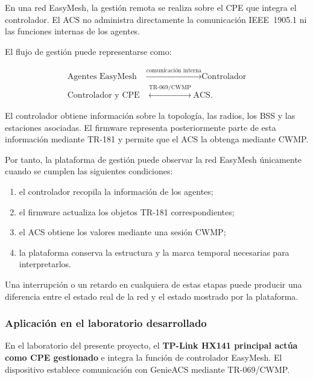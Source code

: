 En una red EasyMesh, la gestión remota se realiza sobre el CPE que integra
el controlador. El ACS no administra directamente la comunicación
IEEE~1905.1 ni las funciones internas de los agentes.

El flujo de gestión puede representarse como:

\[
\begin{aligned}
    \text{Agentes EasyMesh}
    &\xrightarrow{\text{comunicación interna}}
    \text{Controlador}\\
    \text{Controlador y CPE}
    &\overset{\text{TR-069/CWMP}}{\longleftrightarrow}
    \text{ACS}.
\end{aligned}
\]

El controlador obtiene información sobre la topología, las radios, los
BSS y las estaciones asociadas. El firmware representa posteriormente
parte de esta información mediante TR-181 y permite que el ACS la obtenga
mediante CWMP.

Por tanto, la plataforma de gestión puede observar la red EasyMesh
únicamente cuando se cumplen las siguientes condiciones:

\begin{enumerate}
    \item el controlador recopila la información de los agentes;

    \item el firmware actualiza los objetos TR-181 correspondientes;

    \item el ACS obtiene los valores mediante una sesión CWMP;

    \item la plataforma conserva la estructura y la marca temporal
    necesarias para interpretarlos.
\end{enumerate}

Una interrupción o un retardo en cualquiera de estas etapas puede
producir una diferencia entre el estado real de la red y el estado
mostrado por la plataforma.


\subsubsection*{Aplicación en el laboratorio desarrollado}

En el laboratorio del presente proyecto, el
\textbf{TP-Link HX141 principal actúa como CPE gestionado} e integra la
función de controlador EasyMesh. El dispositivo establece comunicación
con GenieACS mediante TR-069/CWMP.

